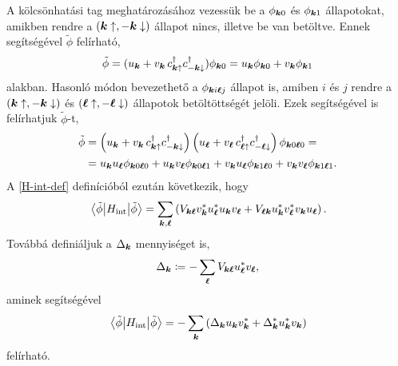 \documentclass[a4paper,12pt,titlepage]{article}
\newcommand{\KK}{{\vb*{k}}}
\newcommand{\LL}{{\vb*{\ell}}}
\begin{document}
A kölcsönhatási tag meghatározásához vezessük be a $\phi_{\KK 0}$ és $\phi_{\KK 1}$ állapotokat, amikben rendre a $\left( \KK \uparrow, -\KK \downarrow \right)$ állapot nincs, illetve be van betöltve.  Ennek segítségével $\tilde{\phi}$ felírható,
\begin{equation}
	\tilde{\phi} = (u_\KK + v_\KK \, c_{\KK \uparrow}^\dagger c_{-\KK \downarrow}^\dagger) \phi_{\KK 0} = u_\KK \phi_{\KK 0} + v_\KK \phi_{\KK 1}
\end{equation}
alakban.  Hasonló módon bevezethető a $\phi_{\KK i \LL j}$ állapot is, amiben $i$ és $j$ rendre a $\left( \KK \uparrow, -\KK \downarrow \right)$ és $\left( \LL \uparrow, -\LL \downarrow \right)$ állapotok betöltöttségét jelöli.  Ezek segítségével is felírhatjuk $\tilde{\phi}$-t,
\begin{equation} \label{phi-tilde-kl}
	\begin{split}
	\tilde{\phi} & = \left( u_\KK + v_\KK \, c_{\KK \uparrow}^\dagger c_{-\KK \downarrow}^\dagger \right) \left( u_\LL + v_\LL \, c_{\LL \uparrow}^\dagger c_{-\LL \downarrow}^\dagger \right) \phi_{\KK 0 \LL 0} = \\
	& = u_\KK u_\LL \phi_{\KK 0 \LL 0} + u_\KK v_\LL \phi_{\KK 0 \LL 1} + v_\KK u_\LL \phi_{\KK 1 \LL 0} + v_\KK v_\LL \phi_{\KK 1 \LL 1}.
	\end{split}
\end{equation}
A \eqref{H-int-def} definícióból ezután következik, hogy
\begin{equation}
	\matrixelement{\tilde{\phi}}{H_\text{int}}{\tilde{\phi}} = \sum\limits_{\KK, \LL} \left( V_{\KK \LL} v_\KK^* u_\LL^* u_\KK v_\LL + V_{\LL \KK} u_\KK^* v_\LL^* v_\KK u_\LL \right).
\end{equation}
Továbbá definiáljuk a $\Delta_\KK$ mennyiséget is,
\begin{equation}
	\Delta_\KK \coloneqq - \sum\limits_\LL V_{\KK \LL} u_\LL^* v_\LL,
\end{equation}
aminek segítségével
\begin{equation} \label{Hintmatrix}
	\matrixelement{\tilde{\phi}}{H_\text{int}}{\tilde{\phi}} = - \sum\limits_\KK \left( \Delta_\KK u_\KK v_\KK^* + \Delta_\KK^* u_\KK^* v_\KK \right)
\end{equation}
felírható.
\end{document}
